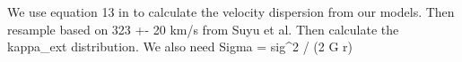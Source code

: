 We use equation 13 in \citet{Suyu13} to calculate the velocity dispersion from our models. Then resample based on 323 +- 20 km/s from Suyu et al. Then calculate the kappa_ext distribution. We also need Sigma = sig^2 / (2 G r)